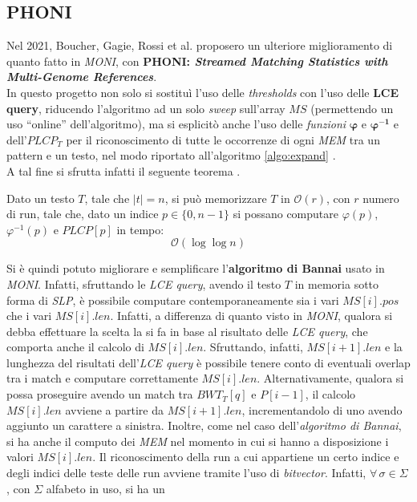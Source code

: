 \subsection{PHONI}
Nel 2021, Boucher, Gagie, Rossi et al. proposero un ulteriore miglioramento di
quanto fatto in \textit{MONI}, con \textbf{PHONI: \textit{Streamed Matching
    Statistics with Multi-Genome References}}.\\
In questo progetto non solo si sostituì l'uso delle \textit{thresholds} con
l'uso delle \textbf{LCE query}, riducendo l'algoritmo ad un solo \textit{sweep}
sull'array $MS$ (permettendo un uso ``online'' dell'algoritmo), ma si
esplicitò anche l'uso delle \textit{funzioni} $\mathbf{\varphi}$ e
$\mathbf{\varphi^{-1}}$ e dell'$PLCP_T$ per il riconoscimento di tutte le
occorrenze di ogni \textit{MEM} tra un pattern e un testo, nel modo 
riportato all'algoritmo \ref{algo:expand} \cite{phoni}.\\
A tal fine si sfrutta infatti il seguente teorema \cite{gagie2020}.
\begin{teorema}
  Dato un testo $T$, tale che $|t|=n$, si può memorizzare $T$ in
  $\mathcal{O}(r)$, con $r$ numero di run, tale che, dato un indice
  $p\in\{0,n-1\}$ si possano computare $\varphi(p)$, $\varphi^{-1}(p)$ e
  $PLCP[p]$ in tempo:
  \[\mathcal{O}(\log\log n)\]
\end{teorema}
Si è quindi potuto migliorare e semplificare l'\textbf{algoritmo di Bannai}
usato in \textit{MONI}. Infatti, sfruttando le
\textit{LCE query}, avendo il testo $T$ in memoria sotto forma di \textit{SLP},
è possibile computare contemporaneamente sia i vari
$MS[i].pos$ che i vari $MS[i].len$. Infatti, a differenza di quanto visto in
\textit{MONI}, qualora si debba effettuare la scelta la si fa in base al
risultato delle \textit{LCE query}, che comporta anche il calcolo di
$MS[i].len$. Sfruttando, infatti, $MS[i+1].len$ e la lunghezza del risultati
dell'\textit{LCE query} è possibile tenere conto di eventuali overlap tra i
match e computare correttamente $MS[i].len$. Alternativamente, qualora si possa
proseguire avendo un match tra  
$BWT_T[q]$ e $P[i-1]$, il calcolo $MS[i].len$ avviene a partire da
$MS[i+1].len$, incrementandolo di uno avendo aggiunto un carattere a sinistra.
Inoltre, come nel caso dell'\textit{algoritmo
  di Bannai}, si ha anche il computo dei \textit{MEM} nel momento in cui si
hanno a 
disposizione i valori $MS[i].len$.
Il riconoscimento della run a cui appartiene un certo indice e degli indici
delle teste delle run avviene tramite l'uso di \textit{bitvector}. Infatti,
$\forall\, \sigma \in \Sigma$, con $\Sigma$ alfabeto in uso, si ha un
